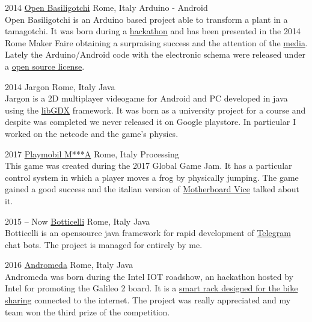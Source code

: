 \documentclass[]{friggeri-cv} %
\begin{document}
\begin{entrylist}


\entry
{2014}
{\href{https://www.facebook.com/Open-Basiligotchi-792468080818688/?rc=p}{Open Basiligotchi}}
{Rome, Italy}
{Arduino - Android\\
	Open Basiligotchi is an Arduino based project able to transform a plant in a tamagotchi. It was born during a \href{http://roma.startupitalia.eu/20041-20140331-basilico}{hackathon} and has been presented in the 2014 Rome Maker Faire obtaining a surpraising success and the attention of the \href{https://youtu.be/M7RPfu6zRww}{media}. Lately the Arduino/Android code with the electronic schema were released under a  \href{https://github.com/Jaeger87/OpenBasiligotchi}{open source license}.
}

\entry
{2014}
{Jargon}
{Rome, Italy}
{Java\\
	Jargon is a 2D multiplayer videogame for Android and PC developed in java using the \href{https://libgdx.badlogicgames.com/}{libGDX} framework.
	It was born as a university project for a course and despite was completed we never released it on Google playstore.
	In particular I worked on the netcode and the game's physics.	
}


\entry
{2017}
{\href{https://globalgamejam.org/2017/games/playmobil-ma}{Playmobil M***A}}
{Rome, Italy}
{Processing\\
	This game was created during the 2017 Global Game Jam. It has a particular control system in which a player moves a frog by physically jumping. The game gained a good success and the italian version of 
	\href{https://motherboard.vice.com/it/article/aejzz8/global-game-jam-2017-giochi-italiani}{Motherboard Vice} talked about it.
}



\entry
{2015 -- Now}
{\href{http://jaegerbox.net/botticelli-index/}{Botticelli}}
{Rome, Italy}
{Java\\
	Botticelli is an opensource java framework for rapid development of \href{https://telegram.org/}{Telegram} chat bots. The project is managed for entirely by me.	
}


\entry
{2016}
{\href{http://jaegerbox.net/third-prize-intel-iot-roadshow-andromeda/}{Andromeda}}
{Rome, Italy}
{Java\\
	Andromeda was born during the Intel IOT roadshow, an hackathon hosted by Intel for promoting the Galileo 2 board. It is a \href{https://youtu.be/BzG7xg5_9JM}{smart rack designed for the bike sharing} connected to the internet. The project was really appreciated and my team won the third prize of the competition. 
}


\end{entrylist}
\end{document}

